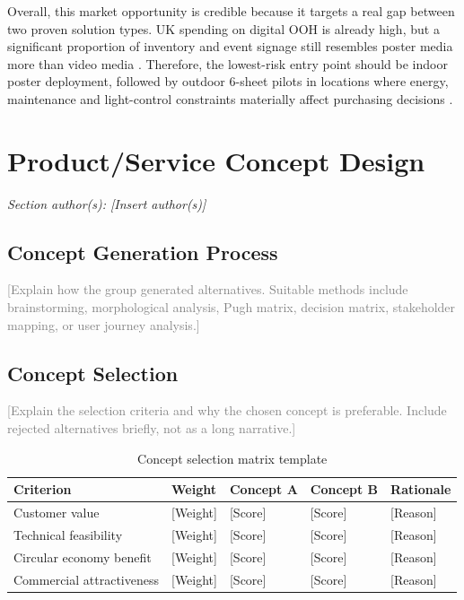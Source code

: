 \documentclass[11pt,a4paper]{article}
\newcommand{\placeholder}[1]{\textcolor{gray}{#1}}
\begin{document}
Overall, this market opportunity is credible because it targets a real gap between two proven solution types. UK spending on digital OOH is already high, but a significant proportion of inventory and event signage still resembles poster media more than video media \cite{ref3,ref4,ref5,ref6}. Therefore, the lowest-risk entry point should be indoor poster deployment, followed by outdoor 6-sheet pilots in locations where energy, maintenance and light-control constraints materially affect purchasing decisions \cite{ref1,ref2,ref3,ref6}.

\section{Product/Service Concept Design}
\textit{Section author(s): [Insert author(s)]}

\subsection{Concept Generation Process}
\placeholder{[Explain how the group generated alternatives. Suitable methods include brainstorming, morphological analysis, Pugh matrix, decision matrix, stakeholder mapping, or user journey analysis.]}

\subsection{Concept Selection}
\placeholder{[Explain the selection criteria and why the chosen concept is preferable. Include rejected alternatives briefly, not as a long narrative.]}

\begin{table}[H]
\centering
\caption{Concept selection matrix template}
\footnotesize
\begin{tabularx}{\textwidth}{Y L{2cm} L{2.5cm} L{2.5cm} Y}
\toprule
\textbf{Criterion} & \textbf{Weight} & \textbf{Concept A} & \textbf{Concept B} & \textbf{Rationale} \\
\midrule
Customer value & [Weight] & [Score] & [Score] & [Reason] \\
Technical feasibility & [Weight] & [Score] & [Score] & [Reason] \\
Circular economy benefit & [Weight] & [Score] & [Score] & [Reason] \\
Commercial attractiveness & [Weight] & [Score] & [Score] & [Reason] \\
\bottomrule
\end{tabularx}
\end{table}
\end{document}
